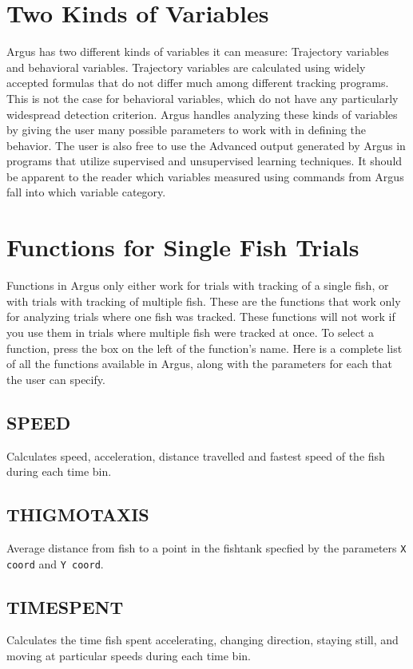 \documentclass[12pt,titlepage]{report}
\begin{document}
\section{Two Kinds of Variables}
Argus has two different kinds of variables it can measure: Trajectory variables and behavioral variables. Trajectory variables are calculated using widely accepted formulas that do not differ much among different tracking programs. This is not the case for behavioral variables, which do not have any particularly widespread detection criterion. Argus handles analyzing these kinds of variables by giving the user many possible parameters to work with in defining the behavior. The user is also free to use the Advanced output generated by Argus in programs that utilize supervised and unsupervised learning techniques. It should be apparent to the reader which variables measured using commands from Argus fall into which variable category.

\section{Functions for Single Fish Trials}
Functions in Argus only either work for trials with tracking of a single fish, or with trials with tracking of multiple fish. These are the functions that work only for analyzing trials where one fish was tracked. These functions will not work if you use them in trials where multiple fish were tracked at once. To select a function, press the box on the left of the function's name. Here is a complete list of all the functions available in Argus, along with the parameters for each that the user can specify.

\subsection{SPEED}
Calculates speed, acceleration, distance travelled and fastest speed of the fish during each time bin.
\subsection{THIGMOTAXIS}
Average distance from fish to a point in the fishtank specfied by the parameters \texttt{X coord} and \texttt{Y coord}. 
\subsection{TIMESPENT}
Calculates the time fish spent accelerating, changing direction, staying still, and moving at particular speeds during each time bin.
\end{document}
